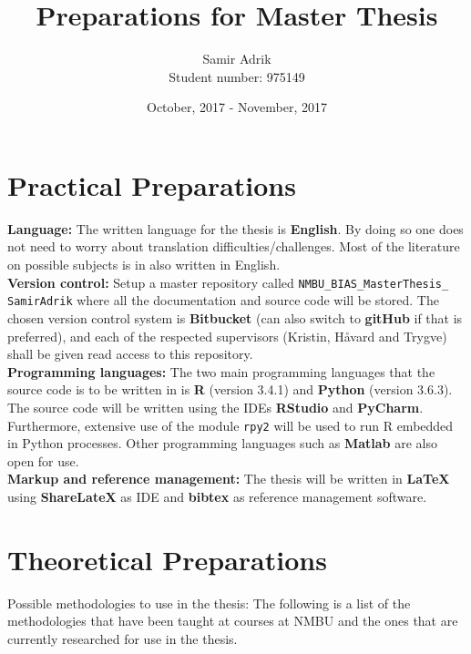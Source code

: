 \documentclass{article}
\title{\textbf{Preparations for Master Thesis}}
\author{\large Samir Adrik\\ \normalsize Student number: 975149}
\date{October, 2017 - November, 2017}
\begin{document}
\maketitle

\vspace{-1cm}\section{Practical Preparations}

\noindent \textbf{Language:} The written language for the thesis is \textbf{English}. By doing so one does not need to worry about translation difficulties/challenges. Most of the literature on possible subjects is in also written in English.\\

\noindent \textbf{Version control:} Setup a master repository called \texttt{NMBU\_BIAS\_MasterThesis\_ SamirAdrik} where all the documentation and source code will be stored. The chosen version control system is \textbf{Bitbucket} (can also switch to \textbf{gitHub} if that is preferred), and each of the respected supervisors (Kristin, Håvard and Trygve) shall be given read access to this repository.\\

\noindent \textbf{Programming languages:} The two main programming languages that the source code is to be written in is \textbf{R} (version 3.4.1) and \textbf{Python} (version 3.6.3). The source code will be written using the IDEs \textbf{RStudio} and \textbf{PyCharm}. Furthermore, extensive use of the module \texttt{rpy2} \citep{gautier2008rpy2} will be used to run R embedded in Python processes. Other programming languages such as \textbf{Matlab} are also open for use.\\

\noindent \textbf{Markup and reference management:} The thesis will be written in \textbf{\LaTeX} $\!$ using \textbf{ShareLateX} as IDE and \textbf{bibtex} as reference management software.

\section{Theoretical Preparations}

\noindent Possible methodologies to use in the thesis: The following is a list of the methodologies that have been taught at courses at NMBU and the ones that are currently researched for use in the thesis.\\
\end{document}
